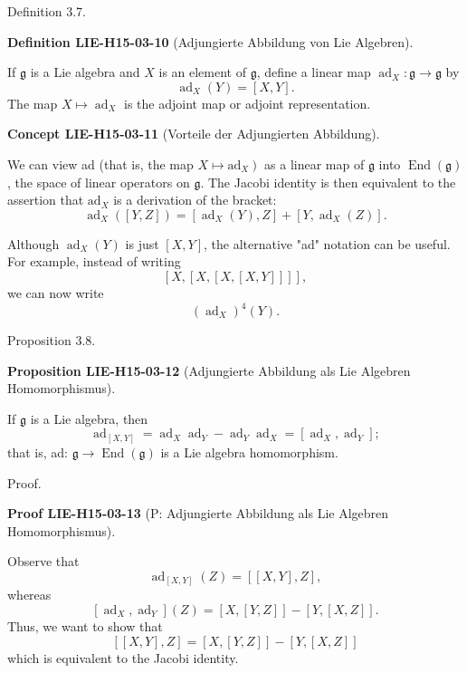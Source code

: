 \documentclass[10pt, letterpaper]{article}
\newcommand{\CustomHeading}[3]{%
  \par\medskip\noindent%
  \textbf{#1 #2} \textnormal{(#3)}.\enskip%
}
\newenvironment{DEF}[2]{\begin{unitbox}\CustomHeading{Definition}{#1}{#2}}{\end{unitbox}}
\newenvironment{PROP}[2]{\begin{unitbox}\CustomHeading{Proposition}{#1}{#2}}{\end{unitbox}}
\newenvironment{CONC}[2]{\begin{unitbox}\CustomHeading{Concept}{#1}{#2}}{\end{unitbox}}
\newenvironment{PROOF}[2]{\begin{unitbox}\CustomHeading{Proof}{#1}{#2}}{\end{unitbox}}
\begin{document}
Definition 3.7. 

\begin{DEF}{LIE-H15-03-10}{Adjungierte Abbildung von Lie Algebren}
If $\mathfrak{g}$ is a Lie algebra and $X$ is an element of $\mathfrak{g}$, define a linear map $\operatorname{ad}_{X}: \mathfrak{g} \rightarrow \mathfrak{g}$ by
$$
\operatorname{ad}_{X}(Y)=[X, Y] .
$$
The map $X \mapsto \operatorname{ad}_{X}$ is the adjoint map or adjoint representation.
\end{DEF}



\begin{CONC}{LIE-H15-03-11}{Vorteile der Adjungierten Abbildung}
We can view ad (that is, the map $\left.X \mapsto \mathrm{ad}_{X}\right)$ as a linear map of $\mathfrak{g}$ into $\operatorname{End}(\mathfrak{g})$, the space of linear operators on $\mathfrak{g}$. The Jacobi identity is then equivalent to the assertion that $\mathrm{ad}_{X}$ is a derivation of the bracket:
$$
\operatorname{ad}_{X}([Y, Z])=\left[\operatorname{ad}_{X}(Y), Z\right]+\left[Y, \operatorname{ad}_{X}(Z)\right] .
$$

Although $\operatorname{ad}_{X}(Y)$ is just $[X, Y]$, the alternative "ad" notation can be useful. For example, instead of writing
$$
[X,[X,[X,[X, Y]]]],
$$
we can now write
$$
\left(\operatorname{ad}_{X}\right)^{4}(Y) .
$$
\end{CONC}

Proposition 3.8. 

\begin{PROP}{LIE-H15-03-12}{Adjungierte Abbildung als Lie Algebren Homomorphismus}
If $\mathfrak{g}$ is a Lie algebra, then
$$
\operatorname{ad}_{[X, Y]}=\operatorname{ad}_{X} \operatorname{ad}_{Y}-\operatorname{ad}_{Y} \operatorname{ad}_{X}=\left[\operatorname{ad}_{X}, \operatorname{ad}_{Y}\right] ;
$$
that is, ad: $\mathfrak{g} \rightarrow \operatorname{End}(\mathfrak{g})$ is a Lie algebra homomorphism.
\end{PROP}


Proof. 

\begin{PROOF}{LIE-H15-03-13}{P: Adjungierte Abbildung als Lie Algebren Homomorphismus}
Observe that
$$
\operatorname{ad}_{[X, Y]}(Z)=[[X, Y], Z],
$$
whereas
$$
\left[\operatorname{ad}_{X}, \operatorname{ad}_{Y}\right](Z)=[X,[Y, Z]]-[Y,[X, Z]] .
$$
Thus, we want to show that
$$
[[X, Y], Z]=[X,[Y, Z]]-[Y,[X, Z]]
$$
which is equivalent to the Jacobi identity.
\end{PROOF}
\end{document}
